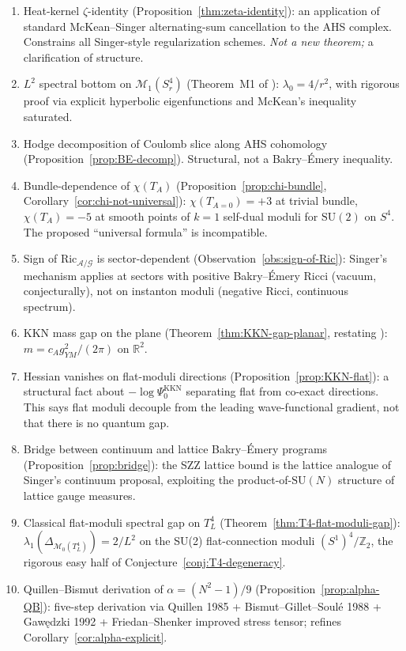 \documentclass[11pt,letterpaper]{article}
\theoremstyle{definition}
\newcommand{\bbR}{\mathbb{R}}
\newcommand{\bbZ}{\mathbb{Z}}
\newcommand{\cA}{\mathcal{A}}
\newcommand{\cG}{\mathcal{G}}
\newcommand{\cM}{\mathcal{M}}
\newcommand{\Ric}{\mathrm{Ric}}
\newcommand{\Lap}{\Delta}
\begin{document}
\begin{enumerate}[label=(R\arabic*),leftmargin=2.5em]
\item Heat-kernel $\zeta$-identity (Proposition~\ref{thm:zeta-identity}): an application of standard McKean--Singer alternating-sum cancellation to the AHS complex. Constrains all Singer-style regularization schemes. \emph{Not a new theorem;} a clarification of structure.

\item $L^2$ spectral bottom on $\cM_1(S^4_r)$ (Theorem~M1 of \cite{bonfioli-core}): $\lambda_0 = 4/r^2$, with rigorous proof via explicit hyperbolic eigenfunctions and McKean's inequality saturated.

\item Hodge decomposition of Coulomb slice along AHS cohomology (Proposition~\ref{prop:BE-decomp}). Structural, not a Bakry--\'Emery inequality.

\item Bundle-dependence of $\chi(T_A)$ (Proposition~\ref{prop:chi-bundle}, Corollary~\ref{cor:chi-not-universal}): $\chi(T_{A=0}) = +3$ at trivial bundle, $\chi(T_A) = -5$ at smooth points of $k=1$ self-dual moduli for $\mathrm{SU}(2)$ on $S^4$. The proposed ``universal formula'' is incompatible.

\item Sign of $\Ric_{\cA/\cG}$ is sector-dependent (Observation~\ref{obs:sign-of-Ric}): Singer's mechanism applies at sectors with positive Bakry--\'Emery Ricci (vacuum, conjecturally), not on instanton moduli (negative Ricci, continuous spectrum).

\item KKN mass gap on the plane (Theorem~\ref{thm:KKN-gap-planar}, restating \cite{KKN1998}): $m = c_A g^2_{YM}/(2\pi)$ on $\bbR^2$.

\item Hessian vanishes on flat-moduli directions (Proposition~\ref{prop:KKN-flat}): a structural fact about $-\log\Psi_0^{\mathrm{KKN}}$ separating flat from co-exact directions. This says flat moduli decouple from the leading wave-functional gradient, not that there is no quantum gap.

\item Bridge between continuum and lattice Bakry--\'Emery programs (Proposition~\ref{prop:bridge}): the SZZ lattice bound is the lattice analogue of Singer's continuum proposal, exploiting the product-of-$\mathrm{SU}(N)$ structure of lattice gauge measures.

\item Classical flat-moduli spectral gap on $T^4_L$ (Theorem~\ref{thm:T4-flat-moduli-gap}): $\lambda_1(\Lap_{\cM_0(T^4_L)}) = 2/L^2$ on the SU(2) flat-connection moduli $(S^1)^4/\bbZ_2$, the rigorous easy half of Conjecture~\ref{conj:T4-degeneracy}.

\item Quillen--Bismut derivation of $\alpha = (N^2-1)/9$ (Proposition~\ref{prop:alpha-QB}): five-step derivation via Quillen 1985 + Bismut--Gillet--Soul\'e 1988 + Gaw\k{e}dzki 1992 + Friedan--Shenker improved stress tensor; refines Corollary~\ref{cor:alpha-explicit}.
\end{enumerate}
\end{document}
